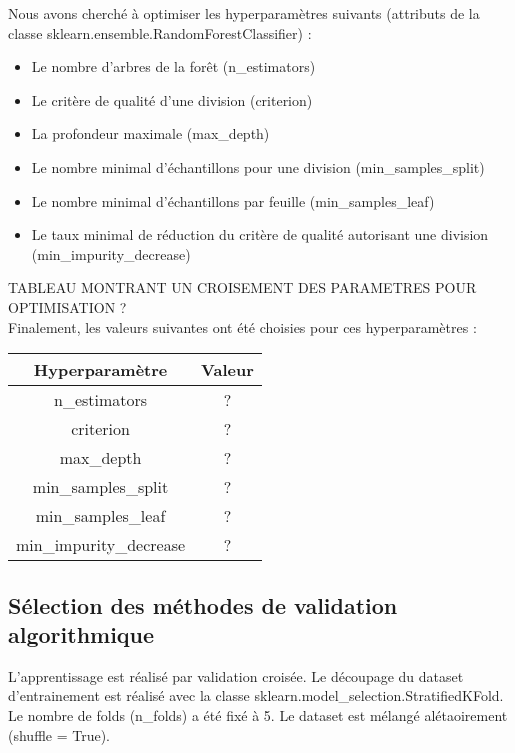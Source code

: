 \documentclass{article}
\begin{document}
Nous avons cherché à optimiser les hyperparamètres suivants (attributs de la classe sklearn.ensemble.RandomForestClassifier) :
\\

\begin{itemize}
\item Le nombre d'arbres de la forêt (n\_estimators)
\item Le critère de qualité d'une division (criterion)
\item La profondeur maximale (max\_depth)
\item Le nombre minimal d'échantillons pour une division (min\_samples\_split)
\item Le nombre minimal d'échantillons par feuille (min\_samples\_leaf)
\item Le taux minimal de réduction du critère de qualité autorisant une division (min\_impurity\_decrease)
\end{itemize}
\vspace{0.5cm}

TABLEAU MONTRANT UN CROISEMENT DES PARAMETRES POUR OPTIMISATION ?
\\

Finalement, les valeurs suivantes ont été choisies pour ces hyperparamètres :
\\

\begin{center}
 \begin{tabular}{|c|c|}
			 \hline
			 \textbf{Hyperparamètre} & \textbf{Valeur} \\
			 \hline
			 n\_estimators & ?  \\
			 \hline
			 criterion & ? \\
			 \hline
			 max\_depth & ?  \\
			 \hline
			 min\_samples\_split & ? \\
			 \hline
			 min\_samples\_leaf & ?  \\
			 \hline
			 min\_impurity\_decrease & ?  \\
			 \hline
 \end{tabular}
\end{center}

\subsection{Sélection des méthodes de validation algorithmique}

L'apprentissage est réalisé par validation croisée. Le découpage du dataset d'entrainement est réalisé avec la classe 
\newline sklearn.model\_selection.StratifiedKFold. Le nombre de folds (n\_folds) a été fixé à 5. Le dataset est mélangé alétaoirement (shuffle = True).
\end{document}
